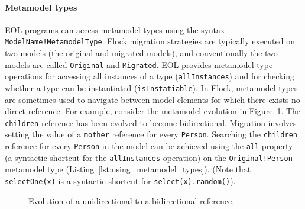 \paragraph{Metamodel types} EOL programs can access metamodel types using the syntax \texttt{Mo\-d\-elNa\-me!Me\-ta\-mo\-d\-elTy\-pe}. Flock migration strategies are typically executed on two models (the original and migrated models), and conventionally the two models are called \texttt{Original} and \texttt{Migrated}. EOL provides metamodel type operations for accessing all instances of a type (\texttt{allIn\-st\-an\-c\-es}) and for checking whether a type can be instantiated (\texttt{isIn\-st\-at\-ia\-b\-le}). In Flock, metamodel types are sometimes used to navigate between model elements for which there exists no direct reference. For example, consider the metamodel evolution in Figure~\ref{fig:mother_mms}. The \texttt{ch\-il\-dr\-en} reference has been evolved to become bidirectional. Migration involves setting the value of a \texttt{mo\-th\-er} reference for every \texttt{Person}. Searching the \texttt{ch\-il\-dr\-en} reference for every \texttt{Pe\-rs\-on} in the model can be achieved using the \texttt{all} property (a syntactic shortcut for the \texttt{allInstances} operation) on the \texttt{Or\-ig\-i\-nal!Per\-s\-on} metamodel type (Listing~\ref{lst:using_metamodel_types}). (Note that \texttt{se\-le\-ctOne(x)} is a syntactic shortcut for \texttt{sel\-ect(x).ran\-dom()}).

\begin{figure}[tb]
	\centering
	\caption{Evolution of a unidirectional to a bidirectional reference.}
\label{fig:mother_mms}
\end{figure}

